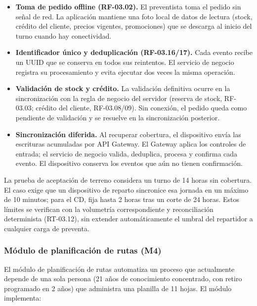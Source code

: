 \begin{itemize}
  \item \textbf{Toma de pedido offline (RF-03.02).} El preventista toma el pedido sin señal de red. La aplicación mantiene una foto local de datos de lectura (stock, crédito del cliente, precios vigentes, promociones) que se descarga al inicio del turno cuando hay conectividad.
  \item \textbf{Identificador único y deduplicación (RF-03.16/17).} Cada evento recibe un UUID que se conserva en todos sus reintentos. El servicio de negocio registra su procesamiento y evita ejecutar dos veces la misma operación.
  \item \textbf{Validación de stock y crédito.} La validación definitiva ocurre en la sincronización con la regla de negocio del servidor (reserva de stock, RF-03.03; crédito del cliente, RF-03.08/09). Sin conexión, el pedido queda como pendiente de validación y se resuelve en la sincronización posterior.
  \item \textbf{Sincronización diferida.} Al recuperar cobertura, el dispositivo envía las escrituras acumuladas por API Gateway. El Gateway aplica los controles de entrada; el servicio de negocio valida, deduplica, procesa y confirma cada evento. El dispositivo conserva los eventos que aún no tienen confirmación.
\end{itemize}

La prueba de aceptación de terreno considera un turno de 14 horas sin cobertura. El caso exige que un dispositivo de reparto sincronice esa jornada en un máximo de 10 minutos; para el CD, fija hasta 2 horas tras un corte de 24 horas. Estos límites se verifican con la volumetría correspondiente y reconciliación determinista (RT-03.12), sin extender automáticamente el umbral del repartidor a cualquier carga de preventa.

\subsubsection{Módulo de planificación de rutas (M4)}

El módulo de planificación de rutas automatiza un proceso que actualmente depende de una sola persona (21 años de conocimiento concentrado, con retiro programado en 2 años) que administra una planilla de 11 hojas. El módulo implementa:

